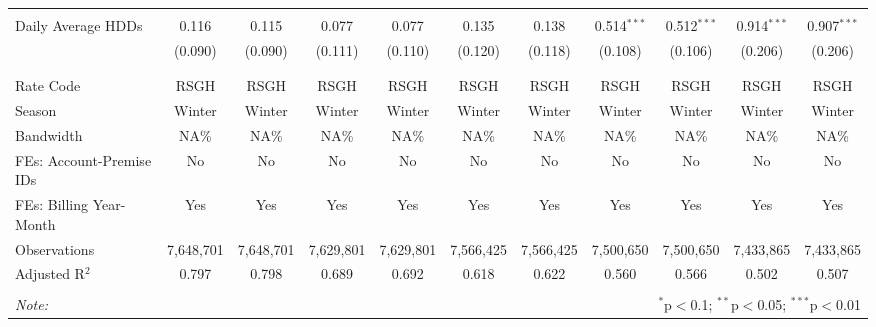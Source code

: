 \begin{table}[!htbp]
\begin{tabular}{@{\extracolsep{5pt}}lcccccccccc}
  & & & & & & & & & & \\ 
 Daily Average HDDs & 0.116 & 0.115 & 0.077 & 0.077 & 0.135 & 0.138 & 0.514$^{***}$ & 0.512$^{***}$ & 0.914$^{***}$ & 0.907$^{***}$ \\ 
  & (0.090) & (0.090) & (0.111) & (0.110) & (0.120) & (0.118) & (0.108) & (0.106) & (0.206) & (0.206) \\ 
  & & & & & & & & & & \\ 
\hline \\[-1.8ex] 
Rate Code & RSGH & RSGH & RSGH & RSGH & RSGH & RSGH & RSGH & RSGH & RSGH & RSGH \\ 
Season & Winter & Winter & Winter & Winter & Winter & Winter & Winter & Winter & Winter & Winter \\ 
Bandwidth & NA\% & NA\% & NA\% & NA\% & NA\% & NA\% & NA\% & NA\% & NA\% & NA\% \\ 
FEs: Account-Premise IDs & No & No & No & No & No & No & No & No & No & No \\ 
FEs: Billing Year-Month & Yes & Yes & Yes & Yes & Yes & Yes & Yes & Yes & Yes & Yes \\ 
Observations & 7,648,701 & 7,648,701 & 7,629,801 & 7,629,801 & 7,566,425 & 7,566,425 & 7,500,650 & 7,500,650 & 7,433,865 & 7,433,865 \\ 
Adjusted R$^{2}$ & 0.797 & 0.798 & 0.689 & 0.692 & 0.618 & 0.622 & 0.560 & 0.566 & 0.502 & 0.507 \\ 
\hline 
\hline \\[-1.8ex] 
\textit{Note:}  & \multicolumn{10}{r}{$^{*}$p$<$0.1; $^{**}$p$<$0.05; $^{***}$p$<$0.01} \\ 
\end{tabular} 
\end{table} 
